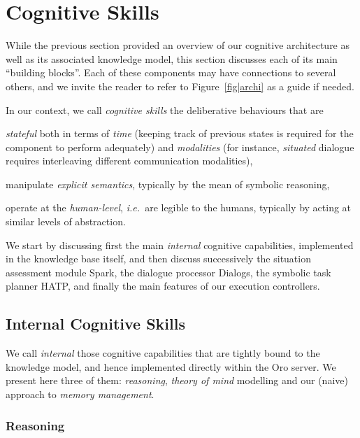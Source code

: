 \documentclass[preprint,3p,times]{elsarticle}
\newcommand{\ie}{{\textit{i.e.\ }}}
\begin{document}
\section{Cognitive Skills}
\label{sec:impl}

While the previous section provided an overview of our cognitive architecture
as well as its associated knowledge model, this section discusses each of its main
``building blocks''. Each of these components may have connections to several
others, and we invite the reader to refer to Figure~\ref{fig|archi} as a guide
if needed.

\begin{inparaenum} In our context, we call \emph{cognitive skills} the
deliberative behaviours that are \item \emph{stateful} both in terms of
\emph{time} (keeping track of previous states is required for the component
to perform adequately) and \emph{modalities} (for instance, \emph{situated}
dialogue requires interleaving different communication modalities), \item
manipulate \emph{explicit semantics}, typically by the mean of symbolic
reasoning, \item operate at the \emph{human-level}, \ie are legible to the
humans, typically by acting at similar levels of abstraction.\end{inparaenum}

We start by discussing first the main \emph{internal} cognitive capabilities,
implemented in the knowledge base itself, and then discuss successively the
situation assessment module {\sc Spark}, the dialogue processor {\sc Dialogs},
the symbolic task planner HATP, and finally the main features of our execution
controllers.

\subsection{Internal Cognitive Skills}
\label{sect|intern}

We call \emph{internal} those cognitive capabilities that are tightly bound to
the knowledge model, and hence implemented directly within the {\sc Oro} server.
We present here three of them: \emph{reasoning}, \emph{theory of mind} modelling
and our (naive) approach to \emph{memory management}.

\subsubsection{Reasoning}
\end{document}
